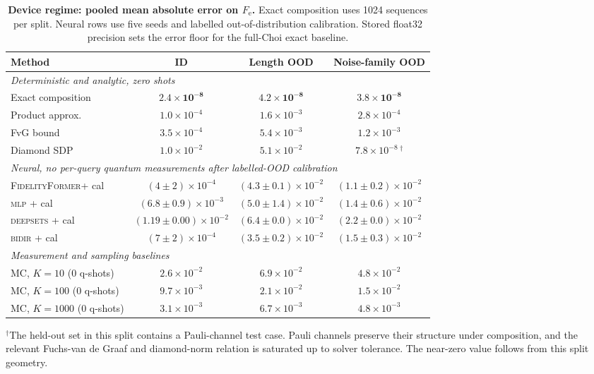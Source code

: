 \documentclass[12pt]{iopart}
\providecommand{\bm}[1]{\boldsymbol{#1}}
\newcommand{\Fe}{F_{\mathrm{e}}}
\newcommand{\fidno}{\textsc{FidelityFormer}}
\begin{document}
\begin{table}[h]
\centering
\caption{\textbf{Device regime: pooled mean absolute error on $\Fe$.} Exact composition uses 1024 sequences per split. Neural rows use five seeds and labelled out-of-distribution calibration. Stored float32 precision sets the error floor for the full-Choi exact baseline.}
\label{tab:device}
\small
\begin{tabular}{lccc}
\toprule
Method & ID & Length OOD & Noise-family OOD \\
\midrule
\multicolumn{4}{l}{\emph{Deterministic and analytic, zero shots}} \\
Exact composition & $\bm{2.4\!\times\!10^{-8}}$ & $\bm{4.2\!\times\!10^{-8}}$ & $\bm{3.8\!\times\!10^{-8}}$ \\
Product approx.   & $1.0\!\times\!10^{-4}$ & $1.6\!\times\!10^{-3}$ & $2.8\!\times\!10^{-4}$ \\
FvG bound         & $3.5\!\times\!10^{-4}$ & $5.4\!\times\!10^{-3}$ & $1.2\!\times\!10^{-3}$ \\
Diamond SDP       & $1.0\!\times\!10^{-2}$ & $5.1\!\times\!10^{-2}$ & $7.8\!\times\!10^{-8}\,^{\dagger}$ \\
\midrule
\multicolumn{4}{l}{\emph{Neural, no per-query quantum measurements after labelled-OOD calibration}} \\
\fidno + cal    & $(4\!\pm\!2)\!\times\!10^{-4}$ & $(4.3\!\pm\!0.1)\!\times\!10^{-2}$ & $(1.1\!\pm\!0.2)\!\times\!10^{-2}$ \\
\textsc{mlp} + cal& $(6.8\!\pm\!0.9)\!\times\!10^{-3}$ & $(5.0\!\pm\!1.4)\!\times\!10^{-2}$ & $(1.4\!\pm\!0.6)\!\times\!10^{-2}$ \\
\textsc{deepsets} + cal & $(1.19\!\pm\!0.00)\!\times\!10^{-2}$ & $(6.4\!\pm\!0.0)\!\times\!10^{-2}$ & $(2.2\!\pm\!0.0)\!\times\!10^{-2}$ \\
\textsc{bidir} + cal    & $(7\!\pm\!2)\!\times\!10^{-4}$ & $(3.5\!\pm\!0.2)\!\times\!10^{-2}$ & $(1.5\!\pm\!0.3)\!\times\!10^{-2}$ \\
\midrule
\multicolumn{4}{l}{\emph{Measurement and sampling baselines}} \\
MC, $K{=}10$ (0 q-shots)   & $2.6\!\times\!10^{-2}$ & $6.9\!\times\!10^{-2}$ & $4.8\!\times\!10^{-2}$ \\
MC, $K{=}100$ (0 q-shots)  & $9.7\!\times\!10^{-3}$ & $2.1\!\times\!10^{-2}$ & $1.5\!\times\!10^{-2}$ \\
MC, $K{=}1000$ (0 q-shots) & $3.1\!\times\!10^{-3}$ & $6.7\!\times\!10^{-3}$ & $4.8\!\times\!10^{-3}$ \\

\bottomrule
\end{tabular}

\vspace{0.3em}
{\footnotesize $^{\dagger}$The held-out set in this split contains a Pauli-channel test case. Pauli channels preserve their structure under composition, and the relevant Fuchs-van de Graaf and diamond-norm relation is saturated up to solver tolerance. The near-zero value follows from this split geometry.}
\end{table}
\end{document}
